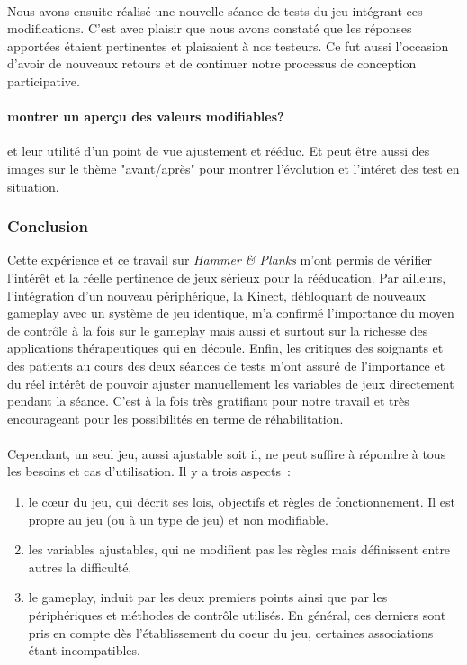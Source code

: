 		
	\paragraph{} Nous avons ensuite réalisé une nouvelle séance de tests du jeu intégrant ces modifications. C'est avec plaisir que nous avons constaté que les réponses apportées étaient pertinentes et plaisaient à nos testeurs. Ce fut aussi l'occasion d'avoir de nouveaux retours et de continuer notre processus de conception participative.
	
\paragraph{montrer un aperçu des valeurs modifiables?} et leur utilité d'un point de vue
ajustement et rééduc. Et peut être aussi des images sur le thème "avant/après" pour montrer l'évolution et l'intéret des test en situation.

	\subsubsection*{Conclusion}
	Cette expérience et ce travail sur \emph{Hammer \& Planks} m'ont permis de vérifier l'intérêt et la réelle pertinence de jeux sérieux pour la rééducation. Par ailleurs, l'intégration d'un nouveau périphérique, la Kinect, débloquant de nouveaux gameplay avec un système de jeu identique, m'a confirmé l'importance du moyen de contrôle à la fois sur le gameplay mais aussi et surtout sur la richesse des applications thérapeutiques qui en découle. Enfin, les critiques des soignants et des patients au cours des deux séances de tests m'ont assuré de l'importance et du réel intérêt de pouvoir ajuster manuellement les variables de jeux directement pendant la séance. C'est à la fois très gratifiant pour notre travail et très encourageant pour les possibilités en terme de réhabilitation.
	
\paragraph{}
Cependant, un seul jeu, aussi ajustable soit il, ne peut suffire à répondre à tous les besoins et cas d'utilisation. Il y a trois aspects~:
\begin{enumerate}
	\item le cœur du jeu, qui décrit ses lois, objectifs et règles de fonctionnement. Il est propre au jeu (ou à un type de jeu) et non modifiable.
	\item les variables ajustables, qui ne modifient pas les règles mais définissent entre autres la difficulté.
	\item le gameplay, induit par les deux premiers points ainsi que par les périphériques et méthodes de contrôle utilisés. En général, ces derniers sont pris en compte dès l'établissement du coeur du jeu, certaines associations étant incompatibles.
\end{enumerate}
